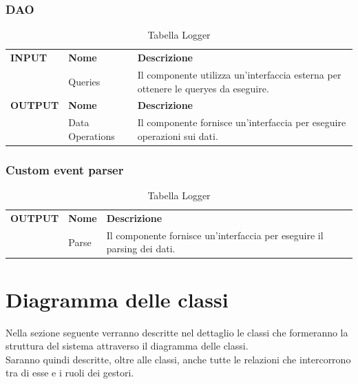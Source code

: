 \documentclass{article}
\begin{document}
\subsubsection{DAO}

\begin{table}[htbp]
    \centering
    \renewcommand{\arraystretch}{1.3} %
    \begin{tabularx}{\textwidth}{| l | l | X |}
        \Xhline{2pt}
        \textbf{INPUT} & \textbf{Nome} & \textbf{Descrizione} \\
        \Xhline{2pt}
         & Queries & Il componente utilizza un'interfaccia esterna per ottenere le queryes da eseguire. \\
        \Xhline{2pt}
        \textbf{OUTPUT} & \textbf{Nome} & \textbf{Descrizione} \\
        \Xhline{2pt}
         & Data Operations & Il componente fornisce un'interfaccia per eseguire operazioni sui dati. \\
        \hline
    \end{tabularx}
    \caption{Tabella Logger}
\end{table}

\subsubsection{Custom event parser}

\begin{table}[htbp]
    \centering
    \renewcommand{\arraystretch}{1.3} %
    \begin{tabularx}{\textwidth}{| l | l | X |}
        \Xhline{2pt}
        \textbf{OUTPUT} & \textbf{Nome} & \textbf{Descrizione} \\
        \Xhline{2pt}
         & Parse & Il componente fornisce un'interfaccia per eseguire il parsing dei dati. \\
        \hline
    \end{tabularx}
    \caption{Tabella Logger}
\end{table}

\clearpage


\section{Diagramma delle classi}

Nella sezione seguente verranno descritte nel dettaglio le classi che formeranno la struttura del sistema attraverso il diagramma delle classi.\\
Saranno quindi descritte, oltre alle classi, anche tutte le relazioni che intercorrono tra di esse e i ruoli dei gestori.\\
\end{document}
